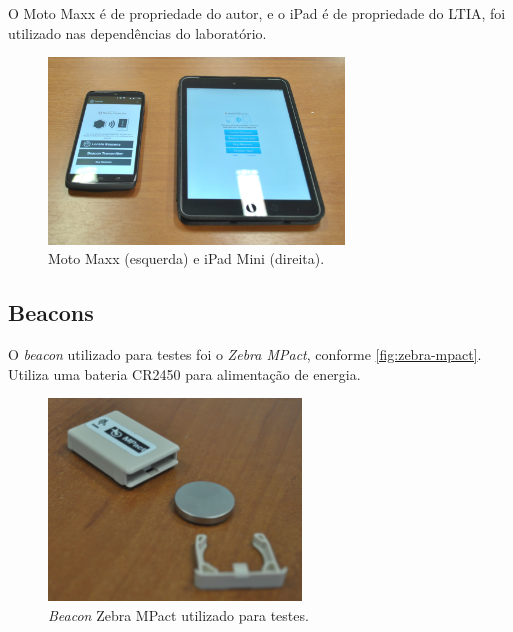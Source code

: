 \documentclass[
		12pt,				%
		openright,			%
		oneside,			%
		a4paper,			%
		chapter=TITLE,		%
		english,			%
		brazil				%
	]{abntex2}
\begin{document}
O Moto Maxx é de propriedade do autor, e o iPad é de propriedade do LTIA, foi utilizado nas dependências do laboratório.

\begin{figure}[htb]
	\caption{\label{fig:motomaxx-ipad}Moto Maxx (esquerda) e iPad Mini (direita).}
	\begin{center}
		\includegraphics[width=0.7\textwidth]{img/motomaxx-ipad.jpg}
	\end{center}
\end{figure}

\subsection{Beacons}\label{sec:beacons-modo}

O \textit{beacon} utilizado para testes foi o \textit{Zebra MPact}, conforme \autoref{fig:zebra-mpact}. Utiliza uma bateria CR2450 para alimentação de energia. 

\begin{figure}[htb]
	\caption{\label{fig:zebra-mpact}\textit{Beacon} Zebra MPact utilizado para testes.}
	\begin{center}
		\includegraphics[width=0.6\textwidth]{img/beacon-mpact2.jpg}
	\end{center}
\end{figure}
\end{document}
